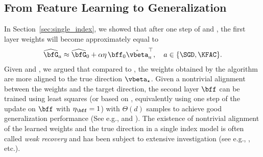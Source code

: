 \subsection{From Feature Learning to Generalization}
\label{sec:single_generalize}
In Section~\ref{sec:single_index}, we showed that after one step of \SGD and \KFAC, the first layer weights will become approximately equal to 
\begin{align}
    \label{eq:one_update}
    \widehat\bfG_{a} \approx \widehat\bfG_0 + \alpha \eta\, \bff_0 \hat\vbeta_{a}^\top, \quad a \in \{\SGD, \KFAC\}.
\end{align}
Given  and , we argued that compared to \SGD, the weights obtained by the \KFAC algorithm are more aligned to the true direction $\vbeta_\star$. Given a nontrivial alignment between the weights and the target direction, the second layer $\bff$ can be trained using least squares (or based on , equivalently using one step of the \KFAC update on $\bff$ with $\eta_{\bff} = 1$) with $\Theta(d)$ samples to achieve good generalization performance (See e.g., \citet[Theorem 11]{ba2022high} and \citet[Section 3.4]{dandibenefits}). The existence of nontrivial alignment of the learned weights and the true direction in a single index model is often called \textit{weak recovery} and has been subject to extensive investigation (see e.g., \citet{arous2021online,dandibenefits,troiani2024fundamental,arnaboldi2024repetita}, etc.). 


